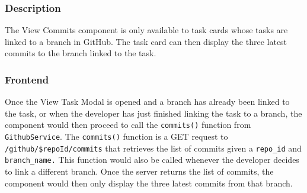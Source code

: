 \documentclass{article}
\def\code#1{\texttt{#1}}
\begin{document}
\subsubsection{Description}
The View Commits component is only available to task cards whose tasks are
linked to a branch in GitHub. The task card can then display the three latest
commits to the branch linked to the task.

\subsubsection{Frontend}
Once the View Task Modal is opened and a branch has already been linked to the
task, or when the developer has just finished linking the task to a branch, the
component would then proceed to call the \code{commits()} function from \code{GithubService}.
The \code{commits()} function is a GET request to \code{/github/\${repoId}/commits} that
retrieves the list of commits given a \code{repo\_id} and \code{branch\_name.} This function
would also be called whenever the developer decides to link a different branch.
Once the server returns the list of commits, the component would then only
display the three latest commits from that branch.
\end{document}
